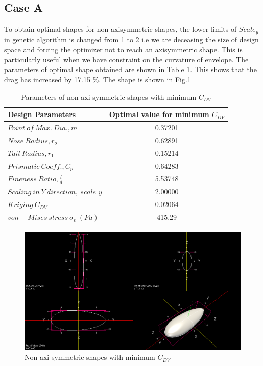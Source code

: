 \subsection*{Case A}
To obtain optimal shapes for non-axisymmetric shapes, the lower limits of $ Scale_y $ in genetic algorithm is changed from 1 to 2 i.e we are deceasing the size of design space and forcing the optimizer not to reach an axisymmetric shape. This is particularly useful when we have constraint on the curvature of envelope. The parameters of optimal shape obtained are shown in Table \ref{Optimal non-axisymmetric body obtained for mimimum Cdv case 2}. This shows that the drag has increased by 17.15 \%. The shape is shown in Fig.\ref{Optimal C DV non axi case 2}

\begin{table}[H]
	\centering
	\caption{Parameters of non axi-symmetric shapes with minimum $ C_{DV}$}
	\label{Optimal non-axisymmetric body obtained for mimimum Cdv case 2}
	\begin{tabular}{lc}
		\hline \hline
		Design Parameters & Optimal value for minimum $ C_{DV} $    \\ \hline \hline
		$ Point\ of\ Max.\ Dia., m$ & 0.37201      \\  
		$ Nose\ Radius, r _{o} $ & 0.62891    \\
		$ Tail\ Radius, r _{1} $ & 0.15214     \\  
		$ Prismatic\ Coeff., C _{p }$ & 0.64283 \\
		$ Fineness\ Ratio, \frac{l}{d} $ &5.53748 \\
		$Scaling\ in\ Y\ direction,\ scale\_y$ & 2.00000 \\ \hline \hline
		
		
		$ Kriging\ C_{DV} $ & 0.02064 \\
		$ von-Mises\ stress\  \sigma _{v} \ (Pa) $ & 415.29 \\
		
		\hline \hline
	\end{tabular}
\end{table}

\begin{figure}[H]
	\centering
	\includegraphics[width=450 pt]{rnd/min_cdv_case2.png}
	\caption{Non axi-symmetric shapes with minimum $ C_{DV}$}
	\label{Optimal C DV non axi case 2} %
\end{figure}
